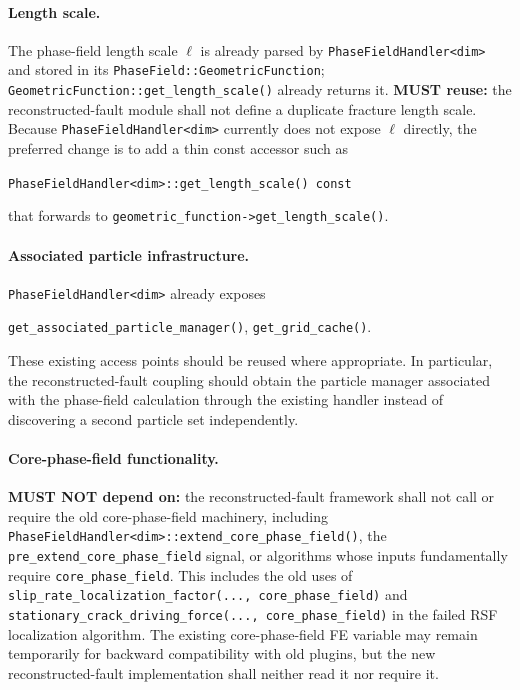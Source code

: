 \documentclass[11pt]{article}
\begin{document}
\paragraph{Length scale.}
The phase-field length scale $\ell$ is already parsed by \texttt{PhaseFieldHandler<dim>} and stored in its \texttt{PhaseField::GeometricFunction}; \texttt{GeometricFunction::get\_length\_scale()} already returns it.  \textbf{MUST reuse:} the reconstructed-fault module shall not define a duplicate fracture length scale.  Because \texttt{PhaseFieldHandler<dim>} currently does not expose $\ell$ directly, the preferred change is to add a thin const accessor such as
\begin{center}
\texttt{PhaseFieldHandler<dim>::get\_length\_scale() const}
\end{center}
that forwards to \texttt{geometric\_function->get\_length\_scale()}.

\paragraph{Associated particle infrastructure.}
\texttt{PhaseFieldHandler<dim>} already exposes
\begin{center}
\texttt{get\_associated\_particle\_manager()},\qquad
\texttt{get\_grid\_cache()}.
\end{center}
These existing access points should be reused where appropriate.  In particular, the reconstructed-fault coupling should obtain the particle manager associated with the phase-field calculation through the existing handler instead of discovering a second particle set independently.

\paragraph{Core-phase-field functionality.}
\textbf{MUST NOT depend on:} the reconstructed-fault framework shall not call or require the old core-phase-field machinery, including \texttt{PhaseFieldHandler<dim>::extend\_core\_phase\_field()}, the \texttt{pre\_extend\_core\_phase\_field} signal, or algorithms whose inputs fundamentally require \texttt{core\_phase\_field}.  This includes the old uses of \texttt{slip\_rate\_localization\_factor(..., core\_phase\_field)} and \texttt{stationary\_crack\_driving\_force(..., core\_phase\_field)} in the failed RSF localization algorithm.  The existing core-phase-field FE variable may remain temporarily for backward compatibility with old plugins, but the new reconstructed-fault implementation shall neither read it nor require it.
\end{document}

